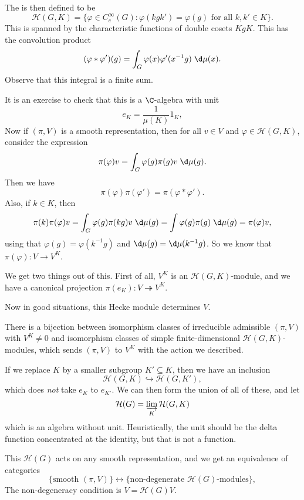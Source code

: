 \documentclass[a4paper]{article}
\begin{document}
The  is then defined to be
\[
  \mathcal{H}(G, K) = \{\varphi \in C_c^\infty(G) : \varphi(kgk') = \varphi(g)\text{ for all }k, k' \in K\}.
\]
This is spanned by the characteristic functions of double cosets $KgK$. This has the convolution product
\[
  (\varphi * \varphi')(g) = \int_G \varphi(x) \varphi'(x^{-1}g)\;\d \mu(x).
\]
Observe that this integral is a finite sum.

It is an exercise to check that this is a $\C$-algebra with unit
\[
  e_K = \frac{1}{\mu(K)} 1_K,
\]
Now if $(\pi, V)$ is a smooth representation, then for all $v \in V$ and $\varphi \in \mathcal{H}(G, K)$, consider the expression
\[
  \pi(\varphi)v = \int_G \varphi(g) \pi(g) v\;\d \mu(g).
\]
Then we have
\[
  \pi(\varphi) \pi(\varphi') = \pi(\varphi * \varphi').
\]
Also, if $k \in K$, then
\[
  \pi(k) \pi(\varphi)v= \int_G \varphi(g) \pi(kg) v\;\d \mu(g) = \int \varphi(g) \pi(g)\;\d \mu(g) = \pi(\varphi) v,
\]
using that $\varphi(g) = \varphi(k^{-1}g)$ and $\d \mu(g) = \d \mu(k^{-1}g)$. So we know that $\pi(\varphi): V \to V^K$.

We get two things out of this. First of all, $V^K$ is an $\mathcal{H}(G, K)$-module, and we have a canonical projection $\pi(e_K): V \twoheadrightarrow V^K$.

Now in good situations, this Hecke module determines $V$.
\begin{prop}
  There is a bijection between isomorphism classes of irreducible admissible $(\pi, V)$ with $V^K \not= 0$ and isomorphism classes of simple finite-dimensional $\mathcal{H}(G, K)$-modules, which sends $(\pi, V)$ to $V^K$ with the action we described.
\end{prop}

If we replace $K$ by a smaller subgroup $K' \subseteq K$, then we have an inclusion
\[
  \mathcal{H}(G, K) \hookrightarrow \mathcal{H}(G, K'),
\]
which does \emph{not} take $e_K$ to $e_{K'}$. We can then form the union of all of these, and let
\[
  \mathcal{H}(G) = \varinjlim_K \mathcal{H}(G, K)
\]
which is an algebra without unit. Heuristically, the unit should be the delta function concentrated at the identity, but that is not a function.

This $\mathcal{H}(G)$ acts on any smooth representation, and we get an equivalence of categories
\[
  \{\text{smooth $(\pi, V)$}\} \leftrightarrow \{\text{non-degenerate $\mathcal{H}(G)$-modules}\},
\]
The non-degeneracy condition is $V = \mathcal{H}(G) V$.
\end{document}
